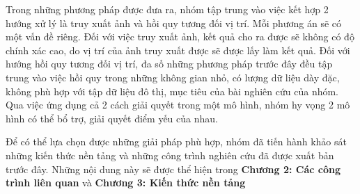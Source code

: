 Trong những phương pháp được đưa ra, nhóm tập trung vào việc kết hợp 2 hướng xử lý là truy xuất ảnh và hồi quy tương đối vị trí. Mỗi phương án sẽ có một vấn đề riêng. Đối với việc truy xuất ảnh, kết quả cho ra được sẽ không có độ chính xác cao, do vị trí của ảnh truy xuất được sẽ được lấy làm kết quả. Đối với hướng hồi quy tương đối vị trí, đa số những phương pháp trước đây đều tập trung vào việc hồi quy trong những không gian nhỏ, có lượng dữ liệu dày đặc, không phù hợp với tập dữ liệu đô thị, mục tiêu của bài nghiên cứu của nhóm. Qua việc ứng dụng cả 2 cách giải quyết trong một mô hình, nhóm hy vọng 2 mô hình có thể bổ trợ, giải quyết điểm yếu của nhau.

Để có thể lựa chọn được những giải pháp phù hợp, nhóm đã tiến hành khảo sát những kiến thức nền tảng và những công trình nghiên cứu đã được xuất bản trước đây. Những nội dung này sẽ được thể hiện trong \textbf{Chương 2: Các công trình liên quan} và \textbf{Chương 3: Kiến thức nền tảng}